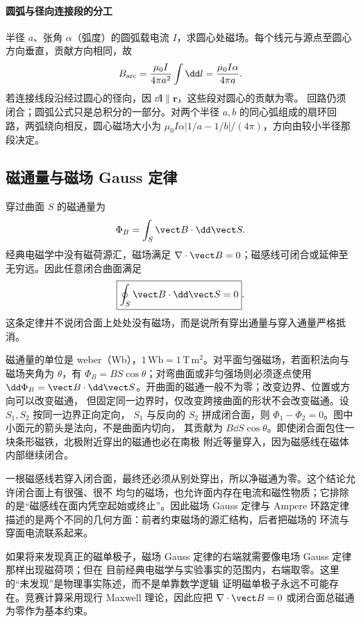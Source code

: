 \motorHelmholtzContext


\paragraph{圆弧与径向连接段的分工}
半径 $a$、张角 $\alpha$（弧度）的圆弧载电流 $I$，求圆心处磁场。每个线元与源点至圆心方向垂直，贡献方向相同，故
\[
 B_{\rm arc}=\frac{\mu_0I}{4\pi a^2}\int\dd l
 =\frac{\mu_0I\alpha}{4\pi a}.
\]
若连接线段沿经过圆心的径向，因 $\dd\boldsymbol l\parallel\boldsymbol r$，这些段对圆心的贡献为零。
回路仍须闭合；圆弧公式只是总积分的一部分。对两个半径 $a,b$ 的同心弧组成的扇环回路，两弧绕向相反，圆心磁场大小为
$\mu_0I\alpha|1/a-1/b|/(4\pi)$，方向由较小半径那段决定。

\subsection{磁通量与磁场 Gauss 定律}

穿过曲面 $S$ 的磁通量为
\begin{equation}
  \Phi_B=\int_S\vect B\cdot\dd\vect S.
\end{equation}
经典电磁学中没有磁荷源汇，磁场满足 $\nabla\cdot\vect B=0$；磁感线可闭合或延伸至无穷远。因此任意闭合曲面满足
\begin{equation}
  \boxed{\oint_S\vect B\cdot\dd\vect S=0}.
\end{equation}
这条定律并不说闭合面上处处没有磁场，而是说所有穿出通量与穿入通量严格抵消。

磁通量的单位是 weber（Wb），$1\,\mathrm{Wb}=1\,\mathrm{T\,m^2}$。对平面匀强磁场，若面积法向与
磁场夹角为 $\theta$，有 $\Phi_B=BS\cos\theta$；对弯曲面或非匀强场则必须逐点使用
$\dd\Phi_B=\vect B\cdot\dd\vect S$。开曲面的磁通一般不为零；改变边界、位置或方向可以改变磁通，
但固定同一边界时，仅改变跨接曲面的形状不会改变磁通。设 $S_1,S_2$ 按同一边界正向定向，
$S_1$ 与反向的 $S_2$ 拼成闭合面，则 $\Phi_1-\Phi_2=0$。图中小面元的箭头是法向，不是曲面内切向，
其贡献为 $B\dd S\cos\theta$。即使闭合面包住一块条形磁铁，北极附近穿出的磁通也必在南极
附近等量穿入，因为磁感线在磁体内部继续闭合。

一根磁感线若穿入闭合面，最终还必须从别处穿出，所以净磁通为零。这个结论允许闭合面上有很强、很不
均匀的磁场，也允许面内存在电流和磁性物质；它排除的是“磁感线在面内凭空起始或终止”。因此磁场
Gauss 定律与 Ampere 环路定律描述的是两个不同的几何方面：前者约束磁场的源汇结构，后者把磁场的
环流与穿面电流联系起来。

如果将来发现真正的磁单极子，磁场 Gauss 定律的右端就需要像电场 Gauss 定律那样出现磁荷项；但在
目前经典电磁学与实验事实的范围内，右端取零。这里的“未发现”是物理事实陈述，而不是单靠数学逻辑
证明磁单极子永远不可能存在。竞赛计算采用现行 Maxwell 理论，因此应把
$\nabla\cdot\vect B=0$ 或闭合面总磁通为零作为基本约束。

